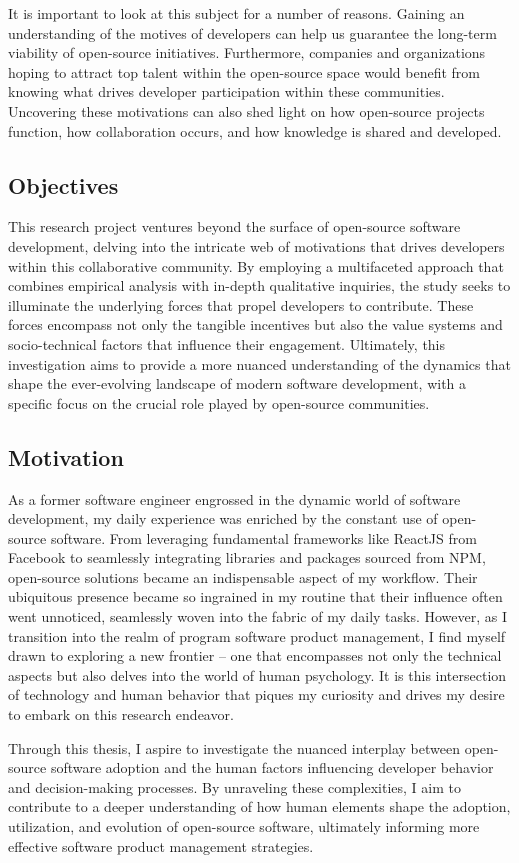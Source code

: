 It is important to look at this subject for a number of reasons. Gaining an understanding of the motives of developers can help us guarantee the long-term viability of open-source initiatives. Furthermore, companies and organizations hoping to attract top talent within the open-source space would benefit from knowing what drives developer participation within these communities.  Uncovering these motivations can also shed light on how open-source projects function, how collaboration occurs, and how knowledge is shared and developed.

\subsection{Objectives}

This research project ventures beyond the surface of open-source software development, delving into the intricate web of motivations that drives developers within this collaborative community. By employing a multifaceted approach that combines empirical analysis with in-depth qualitative inquiries, the study seeks to illuminate the underlying forces that propel developers to contribute. These forces encompass not only the tangible incentives but also the value systems and socio-technical factors that influence their engagement. Ultimately, this investigation aims to provide a more nuanced understanding of the dynamics that shape the ever-evolving landscape of modern software development, with a specific focus on the crucial role played by open-source communities.

\subsection{Motivation}

As a former software engineer engrossed in the dynamic world of software development, my daily experience was enriched by the constant use of open-source software. From leveraging fundamental frameworks like ReactJS from Facebook to seamlessly integrating libraries and packages sourced from NPM, open-source solutions became an indispensable aspect of my workflow. Their ubiquitous presence became so ingrained in my routine that their influence often went unnoticed, seamlessly woven into the fabric of my daily tasks. However, as I transition into the realm of program software product management, I find myself drawn to exploring a new frontier – one that encompasses not only the technical aspects but also delves into the world of human psychology. It is this intersection of technology and human behavior that piques my curiosity and drives my desire to embark on this research endeavor.

Through this thesis, I aspire to investigate the nuanced interplay between open-source software adoption and the human factors influencing developer behavior and decision-making processes. By unraveling these complexities, I aim to contribute to a deeper understanding of how human elements shape the adoption, utilization, and evolution of open-source software, ultimately informing more effective software product management strategies.


\clearpage  %
